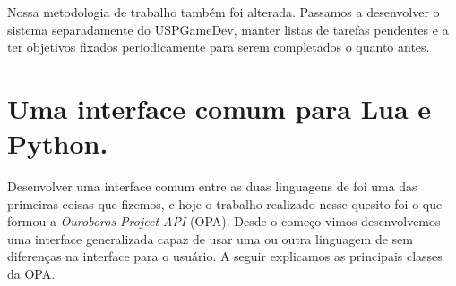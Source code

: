   
  Nossa metodologia de trabalho também foi alterada. Passamos a desenvolver o
  sistema separadamente do USPGameDev, manter listas de tarefas pendentes e a
  ter objetivos fixados periodicamente para serem completados o quanto antes.
  
  \section{Uma interface comum para Lua e Python.}
  \label{sec:atividades:opa}
  Desenvolver uma interface comum entre as duas linguagens de \script{} foi uma das 
  primeiras coisas que fizemos, e hoje o trabalho realizado nesse quesito foi o que
  formou a \emph{Ouroboros Project API} (OPA). Desde o começo vimos desenvolvemos uma
  interface generalizada capaz de usar uma ou outra linguagem de \script{} sem
  diferenças na interface para o usuário. A seguir explicamos as principais
  classes da OPA.
  
